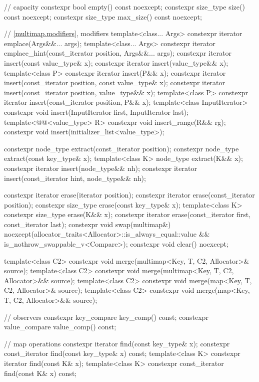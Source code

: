 \begin{codeblock}
{{    // capacity
    constexpr bool empty() const noexcept;
    constexpr size_type size() const noexcept;
    constexpr size_type max_size() const noexcept;

    // \ref{multimap.modifiers}, modifiers
    template<class... Args> constexpr iterator emplace(Args&&... args);
    template<class... Args>
      constexpr iterator emplace_hint(const_iterator position, Args&&... args);
    constexpr iterator insert(const value_type& x);
    constexpr iterator insert(value_type&& x);
    template<class P> constexpr iterator insert(P&& x);
    constexpr iterator insert(const_iterator position, const value_type& x);
    constexpr iterator insert(const_iterator position, value_type&& x);
    template<class P> constexpr iterator insert(const_iterator position, P&& x);
    template<class InputIterator>
      constexpr void insert(InputIterator first, InputIterator last);
    template<@@<value_type> R>
      constexpr void insert_range(R&& rg);
    constexpr void insert(initializer_list<value_type>);

    constexpr node_type extract(const_iterator position);
    constexpr node_type extract(const key_type& x);
    template<class K> node_type extract(K&& x);
    constexpr iterator insert(node_type&& nh);
    constexpr iterator insert(const_iterator hint, node_type&& nh);

    constexpr iterator  erase(iterator position);
    constexpr iterator  erase(const_iterator position);
    constexpr size_type erase(const key_type& x);
    template<class K> constexpr size_type erase(K&& x);
    constexpr iterator  erase(const_iterator first, const_iterator last);
    constexpr void      swap(multimap&)
      noexcept(allocator_traits<Allocator>::is_always_equal::value &&
               is_nothrow_swappable_v<Compare>);
    constexpr void      clear() noexcept;

    template<class C2>
      constexpr void merge(multimap<Key, T, C2, Allocator>& source);
    template<class C2>
      constexpr void merge(multimap<Key, T, C2, Allocator>&& source);
    template<class C2>
      constexpr void merge(map<Key, T, C2, Allocator>& source);
    template<class C2>
      constexpr void merge(map<Key, T, C2, Allocator>&& source);

    // observers
    constexpr key_compare key_comp() const;
    constexpr value_compare value_comp() const;

    // map operations
    constexpr iterator       find(const key_type& x);
    constexpr const_iterator find(const key_type& x) const;
    template<class K> constexpr iterator       find(const K& x);
    template<class K> constexpr const_iterator find(const K& x) const;

}}
\end{codeblock}
